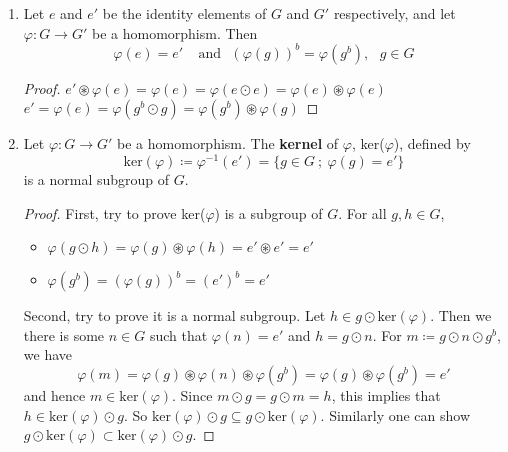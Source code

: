 \begin{remark}
	\begin{enumerate}[label=(\alph*)]
		\item Let \(e\) and \(e{}'\) be the identity elements of \(G\) and \(G{}'\) respectively,
		and let \(\varphi \colon G \rightarrow G{}'\) be a homomorphism. Then
		\[
			\varphi(e) = e{}' \:\:\:\:\: \text{and} \:\:\: (\varphi(g))^b = \varphi(g^b), \:\:\: g \in G
		\]
		\begin{proof}
			\(e{}' \circledast \varphi\left(e\right) = \varphi\left(e\right) = \varphi\left(e \odot e\right)
			= \varphi\left(e\right) \circledast \varphi\left(e\right)\) \\
			\(e{}' = \varphi\left(e\right) = \varphi\left(g^b \odot g\right) = \varphi\left(g^b\right)
			\circledast \varphi\left(g\right)\)
		\end{proof}

		\item Let \(\varphi \colon G \rightarrow G{}'\) be a homomorphism. The \textbf{kernel} of 
		\(\varphi\), ker(\(\varphi\)), defined by 
		\[
			\text{ker}(\varphi) \coloneqq \varphi^{-1}(e{}') = \{g \in G \: ; \: \varphi(g)=e{}'\}	
		\]
		is a normal subgroup of \(G\). 
		\begin{proof}
			First, try to prove ker(\(\varphi\)) is a subgroup of \(G\). For all \(g, h \in G\),
			\begin{itemize}
				\item \(\varphi\left(g \odot h\right) = \varphi\left(g\right) \circledast
				\varphi \left(h\right) = e{}' \circledast e{}' = e{}' \)
				\item \(\varphi\left(g^b\right) = \left(\varphi\left(g\right)\right)^b 
				= \left(e{}'\right)^b = e{}'\)
			\end{itemize}
			Second, try to prove it is a normal subgroup. Let \(h \in g \odot \text{ker}\left(\varphi\right)\). 
			Then we there is some \(n \in G\) such that \(\varphi\left(n\right) = e{}'\) and 
			\(h = g \odot n\). For \(m \coloneqq g \odot n \odot g^b\), we have
			\[
				\varphi(m) = \varphi(g) \circledast	\varphi(n) \circledast \varphi(g^b)
				= \varphi(g) \circledast \varphi(g^b) = e{}' 
			\]
			and hence \(m \in \text{ker}\left(\varphi\right)\). Since \(m \odot g = g \odot m = h\),
			this implies that \(h \in \text{ker}\left(\varphi\right) \odot g\). So 
			\(\text{ker}\left(\varphi\right) \odot g \subseteq g \odot \text{ker}\left(\varphi\right)\).
			Similarly one can show \(g \odot \text{ker}\left(\varphi\right) \subset
			\text{ker}\left(\varphi\right) \odot g \).
		\end{proof}


\end{enumerate}
\end{remark}
